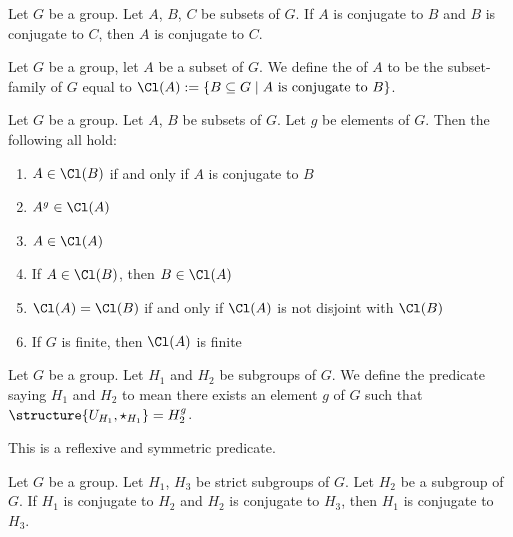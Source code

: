 \begin{theorem}
Let $G$ be a group. Let $A$, $B$, $C$ be subsets of $G$.
If $A$ is conjugate to $B$ and $B$ is conjugate to $C$,
then $A$ is conjugate to $C$.
\end{theorem}

\begin{definition}
Let $G$ be a group, let $A$ be a subset of $G$.
We define the  of $A$ to be the subset-family
of $G$ equal to $\Cl(A) := \{B\subset G\mid A\mbox{ is conjugate to }B\}$.
\end{definition}

\begin{theorem}
Let $G$ be a group. Let $A$, $B$ be subsets of $G$.
Let $g$ be elements of $G$. Then the following all hold:
\begin{enumerate}
\item{} $A\in\Cl(B)$ if and only if $A$ is conjugate to $B$
\item{} $A^{g}\in\Cl(A)$
\item{} $A\in\Cl(A)$
\item{} If $A\in\Cl(B)$, then $B\in\Cl(A)$
\item{} $\Cl(A)=\Cl(B)$ if and only if $\Cl(A)$ is not
  disjoint with $\Cl(B)$
\item{} If $G$ is finite, then $\Cl(A)$ is finite
\end{enumerate}
\end{theorem}

\begin{definition}
Let $G$ be a group. Let $H_{1}$ and $H_{2}$ be subgroups of $G$.
We define the predicate saying $H_{1}$ and $H_{2}$ 
to mean there exists an element $g$ of $G$ such that $\structure{U_{H_{1}},\star_{H_{1}}}=H_{2}^{g}$.

This is a reflexive and symmetric predicate.
\end{definition}

\begin{theorem}
Let $G$ be a group. Let $H_{1}$, $H_{3}$ be strict subgroups of $G$.
Let $H_{2}$ be a subgroup of $G$.
If $H_{1}$ is conjugate to $H_{2}$ and $H_{2}$ is conjugate to $H_{3}$,
then $H_{1}$ is conjugate to $H_{3}$.
\end{theorem}

